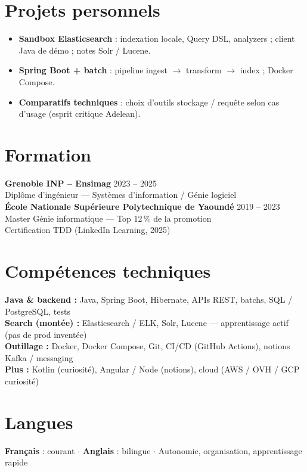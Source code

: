 \documentclass[10pt,a4paper]{article}
\begin{document}
\section{Projets personnels}
\begin{itemize}
  \item \textbf{Sandbox Elasticsearch} : indexation locale, Query DSL, analyzers ; client Java de d\'emo ; notes Solr / Lucene.
  \item \textbf{Spring Boot + batch} : pipeline ingest $\rightarrow$ transform $\rightarrow$ index ; Docker Compose.
  \item \textbf{Comparatifs techniques} : choix d'outils stockage / requ\^ete selon cas d'usage (esprit critique Adelean).
\end{itemize}

\section{Formation}
\textbf{Grenoble INP -- Ensimag} \hfill 2023 -- 2025\\
Dipl\^ome d'ing\'enieur --- Syst\`emes d'information / G\'enie logiciel\\[2pt]
\textbf{\'Ecole Nationale Sup\'erieure Polytechnique de Yaound\'e} \hfill 2019 -- 2023\\
Master G\'enie informatique --- Top 12\,\% de la promotion\\[2pt]
Certification TDD (LinkedIn Learning, 2025)

\section{Comp\'etences techniques}
\textbf{Java \& backend :} Java, Spring Boot, Hibernate, APIs REST, batchs, SQL / PostgreSQL, tests\\
\textbf{Search (mont\'ee) :} Elasticsearch / ELK, Solr, Lucene --- apprentissage actif (pas de prod invent\'ee)\\
\textbf{Outillage :} Docker, Docker Compose, Git, CI/CD (GitHub Actions), notions Kafka / messaging\\
\textbf{Plus :} Kotlin (curiosit\'e), Angular / Node (notions), cloud (AWS / OVH / GCP curiosit\'e)

\section{Langues}
\textbf{Fran\c{c}ais} : courant $\cdot$ \textbf{Anglais} : bilingue $\cdot$ Autonomie, organisation, apprentissage rapide
\end{document}
